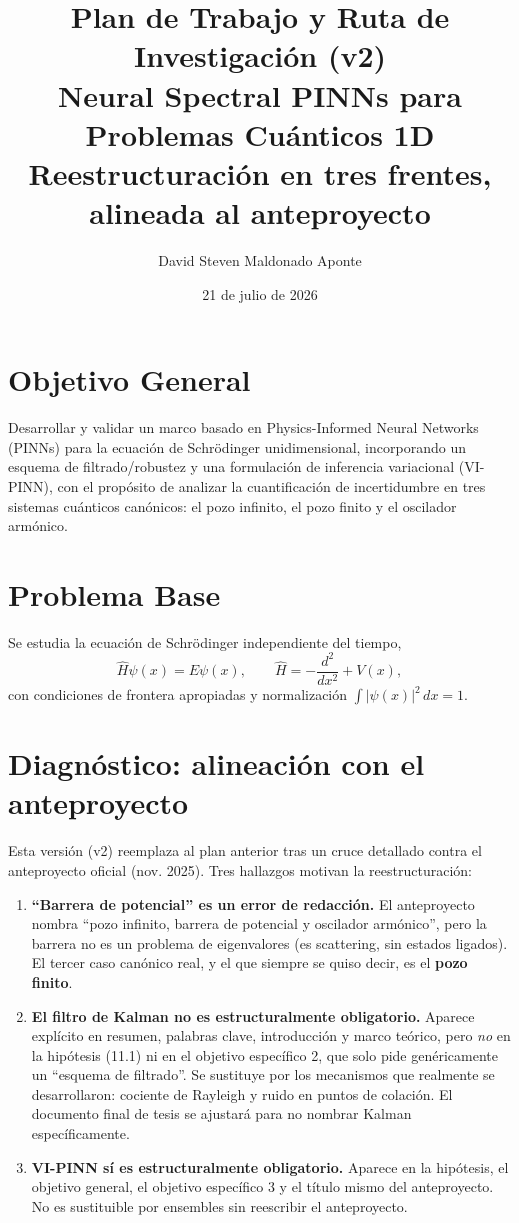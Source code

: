 \documentclass[11pt]{article}
\title{Plan de Trabajo y Ruta de Investigación (v2)\\
\large Neural Spectral PINNs para Problemas Cuánticos 1D\\
\normalsize Reestructuración en tres frentes, alineada al anteproyecto}
\author{David Steven Maldonado Aponte}
\date{21 de julio de 2026}
\begin{document}
\maketitle
\tableofcontents

\section{Objetivo General}

Desarrollar y validar un marco basado en Physics-Informed Neural Networks (PINNs) para
la ecuación de Schrödinger unidimensional, incorporando un esquema de filtrado/robustez
y una formulación de inferencia variacional (VI-PINN), con el propósito de analizar la
cuantificación de incertidumbre en tres sistemas cuánticos canónicos: el pozo infinito,
el pozo finito y el oscilador armónico.

\section{Problema Base}

Se estudia la ecuación de Schrödinger independiente del tiempo,
\[
\hat{H}\psi(x) = E\psi(x), \qquad \hat{H} = -\frac{d^2}{dx^2} + V(x),
\]
con condiciones de frontera apropiadas y normalización $\int |\psi(x)|^2\,dx = 1$.

\section{Diagnóstico: alineación con el anteproyecto}

Esta versión (v2) reemplaza al plan anterior tras un cruce detallado contra el
anteproyecto oficial (nov. 2025). Tres hallazgos motivan la reestructuración:

\begin{enumerate}
    \item \textbf{``Barrera de potencial'' es un error de redacción.} El anteproyecto
    nombra ``pozo infinito, barrera de potencial y oscilador armónico'', pero la
    barrera no es un problema de eigenvalores (es scattering, sin estados ligados).
    El tercer caso canónico real, y el que siempre se quiso decir, es el
    \textbf{pozo finito}.
    \item \textbf{El filtro de Kalman no es estructuralmente obligatorio.} Aparece
    explícito en resumen, palabras clave, introducción y marco teórico, pero
    \emph{no} en la hipótesis (11.1) ni en el objetivo específico 2, que solo pide
    genéricamente un ``esquema de filtrado''. Se sustituye por los mecanismos que
    realmente se desarrollaron: cociente de Rayleigh y ruido en puntos de colación.
    El documento final de tesis se ajustará para no nombrar Kalman específicamente.
    \item \textbf{VI-PINN sí es estructuralmente obligatorio.} Aparece en la
    hipótesis, el objetivo general, el objetivo específico 3 y el título mismo del
    anteproyecto. No es sustituible por ensembles sin reescribir el anteproyecto.
\end{enumerate}
\end{document}
